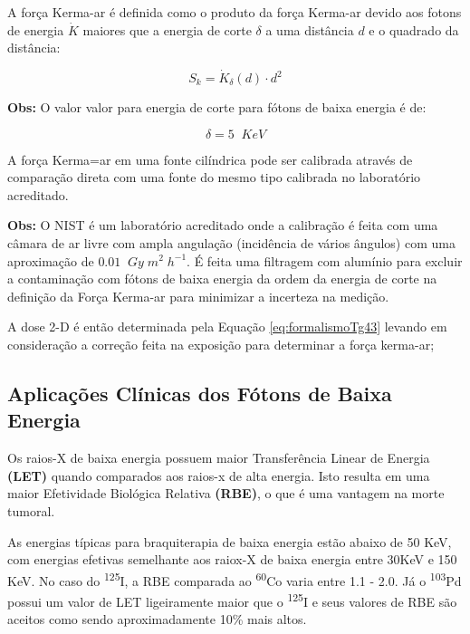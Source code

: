 \documentclass[11pt,a4paper]{article}
\begin{document}
			A força Kerma-ar é definida como o produto da força Kerma-ar devido aos fotons de energia $\dot{K}$ maiores que a energia de corte $\delta$ a uma distância $d$ e o quadrado da distância:

				\begin{equation}
					S_k = \dot{K}_\delta (d) \cdot d^2
				\end{equation}

				\textbf{\textcolor{CarnationPink}{Obs:} } O valor valor para energia de corte para fótons de baixa energia é de:

				$$\delta = 5 \; \; KeV$$
				
			A força Kerma=ar em uma fonte cilíndrica pode ser calibrada através de comparação direta com uma fonte do mesmo tipo calibrada no laboratório acreditado.

			\textbf{\textcolor{CarnationPink}{Obs:}} O NIST é um laboratório acreditado onde a calibração é feita com uma câmara de ar livre com ampla angulação (incidência de vários ângulos) com uma aproximação de $0.01 \; \; Gy \; m^2 \; h^{-1}$. É feita uma filtragem com alumínio para excluir a contaminação com fótons de baixa energia da ordem da energia de corte na definição da Força Kerma-ar para minimizar a incerteza na medição.

			A dose 2-D é então determinada pela Equação \ref{eq:formalismoTg43} levando em consideração a correção feita na exposição para determinar a força kerma-ar;

		\subsection{Aplicações Clínicas dos Fótons de Baixa Energia}

			Os raios-X de baixa energia possuem maior Transferência Linear de Energia \textbf{\textcolor{CarnationPink}{(LET)}} quando comparados aos raios-x de alta energia. Isto resulta em uma maior Efetividade Biológica Relativa \textbf{\textcolor{CarnationPink}{(RBE)}}, o que é uma vantagem na morte tumoral.

			As energias típicas para braquiterapia de baixa energia estão abaixo de 50 KeV, com energias efetivas semelhante aos raiox-X de baixa energia entre 30KeV e 150 KeV. No caso do \textsuperscript{125}I, a RBE comparada ao \textsuperscript{60}Co varia entre 1.1 - 2.0. Já o \textsuperscript{103}Pd possui um valor de LET ligeiramente maior que o \textsuperscript{125}I e seus valores de RBE são aceitos como sendo aproximadamente 10\% mais altos.
\end{document}

